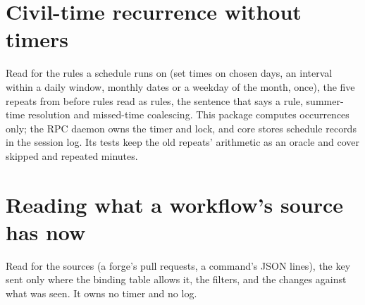 













\chapter{Civil-time recurrence without timers}

Read  for the rules a schedule runs on (set times on chosen days, an interval within a daily window, monthly dates or a weekday of the month, once), the five repeats from before rules read as rules, the sentence that says a rule, summer-time resolution and missed-time coalescing. This package computes occurrences only; the RPC daemon owns the timer and lock, and core stores schedule records in the session log. Its tests keep the old repeats' arithmetic as an oracle and cover skipped and repeated minutes.


\chapter{Reading what a workflow's source has now}

Read  for the sources (a forge's pull requests, a command's JSON lines), the key sent only where the binding table allows it, the filters, and the changes against what was seen. It owns no timer and no log.



